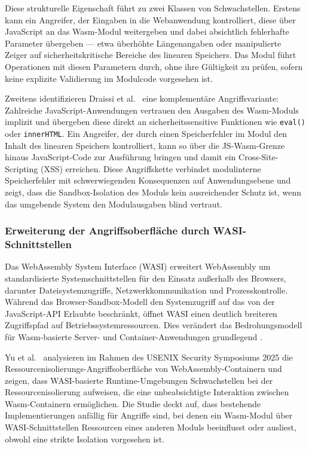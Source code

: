Diese strukturelle Eigenschaft führt zu zwei Klassen von Schwachstellen. Erstens kann ein Angreifer, der Eingaben in die Webanwendung kontrolliert, diese über JavaScript an das Wasm-Modul weitergeben und dabei absichtlich fehlerhafte Parameter übergeben --- etwa überhöhte Längenangaben oder manipulierte Zeiger auf sicherheitskritische Bereiche des linearen Speichers. Das Modul führt Operationen mit diesen Parametern durch, ohne ihre Gültigkeit zu prüfen, sofern keine explizite Validierung im Modulcode vorgesehen ist.

Zweitens identifizieren Draissi et al.~\cite{10.1145/3728937} eine komplementäre Angriffsvariante: Zahlreiche JavaScript-Anwendungen vertrauen den Ausgaben des Wasm-Moduls implizit und übergeben diese direkt an sicherheitssensitive Funktionen wie \texttt{eval()} oder \texttt{innerHTML}. Ein Angreifer, der durch einen Speicherfehler im Modul den Inhalt des linearen Speichers kontrolliert, kann so über die JS-Wasm-Grenze hinaus JavaScript-Code zur Ausführung bringen und damit ein Cross-Site-Scripting (XSS) erreichen. Diese Angriffskette verbindet modulinterne Speicherfehler mit schwerwiegenden Konsequenzen auf Anwendungsebene und zeigt, dass die Sandbox-Isolation des Moduls kein ausreichender Schutz ist, wenn das umgebende System den Modulausgaben blind vertraut.

\subsubsection{Erweiterung der Angriffsoberfläche durch WASI-Schnittstellen}

Das WebAssembly System Interface (WASI) erweitert WebAssembly um standardisierte Systemschnittstellen für den Einsatz außerhalb des Browsers, darunter Dateisystemzugriffe, Netzwerkkommunikation und Prozesskontrolle. Während das Browser-Sandbox-Modell den Systemzugriff auf das von der JavaScript-API Erlaubte beschränkt, öffnet WASI einen deutlich breiteren Zugriffspfad auf Betriebssystemressourcen. Dies verändert das Bedrohungsmodell für Wasm-basierte Server- und Container-Anwendungen grundlegend \cite{bytecode_alliance}.

Yu et al.~\cite{309562} analysieren im Rahmen des USENIX Security Symposiums 2025 die Ressourcenisolierungs-Angriffsoberfläche von WebAssembly-Containern und zeigen, dass WASI-basierte Runtime-Umgebungen Schwachstellen bei der Ressourcenisolierung aufweisen, die eine unbeabsichtigte Interaktion zwischen Wasm-Containern ermöglichen. Die Studie deckt auf, dass bestehende Implementierungen anfällig für Angriffe sind, bei denen ein Wasm-Modul über WASI-Schnittstellen Ressourcen eines anderen Moduls beeinflusst oder ausliest, obwohl eine strikte Isolation vorgesehen ist.

